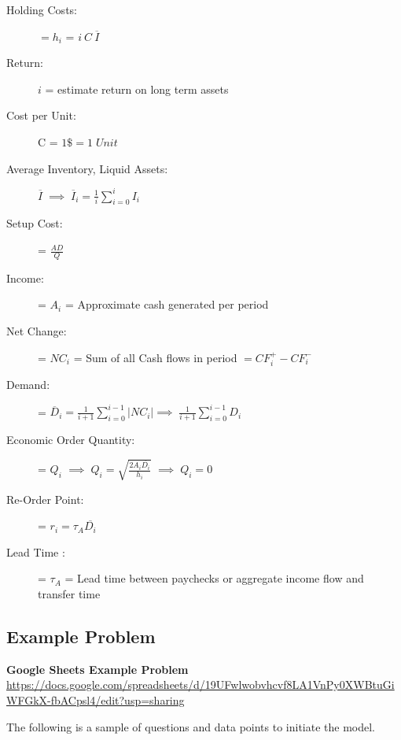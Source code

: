 \documentclass{article}
\begin{document}
\begin{description}
	\item[Holding Costs:] $= h_{i}$ = \; $ i \:C\: \overline{I} $
	\item[Return:] $ i $ = estimate return on long term assets
	\item[Cost per Unit:] C = $1\$ =1 \; Unit $
	\item[Average Inventory, Liquid Assets:] $\overline{I} \; \implies \; \overline{I}_{i} = \frac{1}{i}\sum_{i=0}^{i}I_{i}$
	\item[Setup Cost:]  = $\frac{AD}{Q}$
	\item[Income:]  = $A_{i}$ = Approximate cash generated per period
	\item[Net Change:]= $NC_{i}$ = \; Sum of all Cash flows in period \; $=CF_{i}^{+}-CF_{i}^{-}$
	\item[Demand:]= $\overline{D}_{i} = \frac{1}{i + 1}\sum_{i=0}^{i-1}|NC_{i}| \implies \; \frac{1}{i + 1}\sum_{i=0}^{i-1}D_{i}$
	\item[Economic Order Quantity:]= $Q_{i}$
	\subitem[if $I_{i} < r_{i}$] $\implies\;  Q_{i} = \sqrt{\frac{2A_{i}\overline{D_{i}}}{h_{i}}}$
	\subitem[if $I_{i} > r_{i}$]$ \implies\;  Q_{i} = 0$
	\item[Re-Order Point:]= $r_{i} = \tau_{A} \overline{D_{i}}$
	\item[Lead Time :]= $\tau_{A}$ = Lead time between paychecks or aggregate income flow and transfer time
\end{description}

\subsection{Example Problem}

\begin{flushleft}
\textbf{Google Sheets Example Problem}
 \url{https://docs.google.com/spreadsheets/d/19UFwlwobvhcvf8LA1VnPy0XWBtuGiWFGkX-fbACpsl4/edit?usp=sharing}
\end{flushleft}

The following is a sample of questions and data points to initiate the model. 
\end{document}
